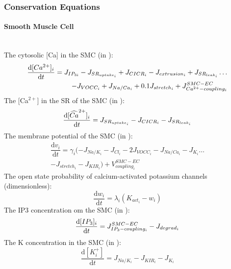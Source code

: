 \subsubsection{Conservation Equations}
\paragraph{Smooth Muscle Cell}~\\
%
The cytosolic [\gls{Ca}] in the \gls{SMC} (in \uM):
\begin{equation}\label{eq:ci}
\begin{split}
\dfrac{\mathrm{d}[Ca^{2+}]_{i}}{\mathrm{d}t} = J_{IP_{3i}} - J_{SR_{uptake_{i}}} + J_{CICR_{i}} - J_{extrusion_{i}} +  J_{SR_{leak_{i}}}\dots \\
 - J_{VOCC_{i}} + J_{Na/Ca_{i}}  + 0.1J_{stretch_{i}} + J_{Ca^{2+}-coupling_{i}}^{SMC-EC}
\end{split} 
\end{equation}
%
The [Ca$^{2+}$] in the \gls{SR} of the \gls{SMC} (in \uM):
\begin{equation} \label{eq:si}
\dfrac{\mathrm{d}[\widehat{Ca}^{2+}]_{i}}{\mathrm{d}t} =  J_{SR_{uptake_{i}}} - J_{CICR_{i}} - J_{SR_{leak_{i}}}
\end{equation}
%
The membrane potential of the \gls{SMC} (in \mV):
\begin{equation} \label{eq:vi}
\begin{split}
\dfrac{\mathrm{d}v_{i}}{\mathrm{d}t} = \gamma_{i}( -J_{Na/K_{i}} - J_{Cl_{i}} - 2J_{VOCC_{i}}- J_{Na/Ca_{i}} - J_{K_{i}} \dots \\
- J_{stretch_{i}} - J_{KIR_{i}} ) +V^{SMC-EC}_{coupling_{i}}
\end{split}
\end{equation}
%
The open state probability of calcium-activated potassium channels (dimensionless):
\begin{equation} \label{eq:dwidt}
\dfrac{\mathrm{d}w_{i}}{\mathrm{d}t} =  \lambda_{i} \left( K_{act_{i}} - w_{i} \right)
\end{equation}
%
The \gls{IP3} concentration om the \gls{SMC} (in \uM):
\begin{equation} \label{eq:dIidt}
\dfrac{\mathrm{d}[IP_{3}] _{i}}{\mathrm{d}t} = J^{SMC-EC}_{IP_{3}-coupling_{i}} - J_{degrad_{i}}
\end{equation}
%
The \gls{K} concentration in the \gls{SMC} (in \uM):
\begin{equation} \label{eq:dkidt}
\dfrac{\mathrm{d} [K^+_{i}]}{\mathrm{d}t}  = J_{Na/K_{i}}  - J_{KIR_{i}} - J_{K_{i}}
\end{equation}

